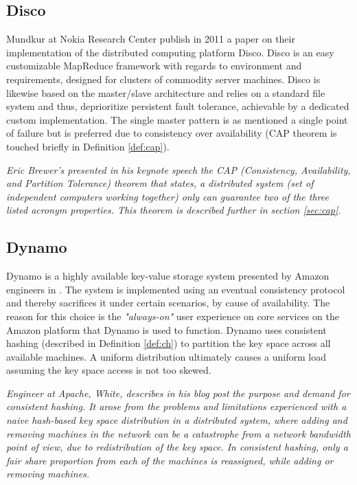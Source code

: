 \subsection*{Disco}
Mundkur \etal at Nokia Research Center publish in 2011 a paper on their implementation of the distributed computing platform Disco\cite{PageDisco}\cite{Mundkur:2011:DCP:2034654.2034670}. Disco is an easy customizable MapReduce framework with regards to environment and requirements, designed for clusters of commodity server machines. Disco is likewise based on the master/slave architecture and relies on a standard file system and thus, deprioritize persistent fault tolerance, achievable by a dedicated custom implementation. The single master pattern is as mentioned a single point of failure but is preferred due to consistency over availability (CAP theorem is touched briefly in Definition \ref{def:cap}).
\vspace*{5mm}

\begin{definition} \label{def:cap}
\textit{Eric Brewer's presented in his keynote speech}\cite{Brewer2000} \textit{the CAP (Consistency, Availability, and Partition Tolerance) theorem that states, a distributed system (set of independent computers working together) only can guarantee two of the three listed acronym properties. This theorem is described further in section \ref{sec:cap}.}
\end{definition}

\vspace*{3mm}
\subsection*{Dynamo}
Dynamo is a highly available key-value storage system presented by Amazon engineers in \cite{DeCandia:2007:DAH:1294261.1294281}. The system is implemented using an eventual consistency protocol and thereby sacrifices it under certain scenarios, by cause of availability. The reason for this choice is the \textit{"always-on"} user experience on core services on the Amazon platform that Dynamo is used to function. Dynamo uses consistent hashing (described in Definition \ref{def:ch}) to partition the key space across all available machines. A uniform distribution ultimately causes a uniform load assuming the key space access is not too skewed.
\vspace*{3mm}

\begin{definition} \label{def:ch}
\textit{Engineer at Apache, White, describes in his blog post} \cite{PageWhiteCH} \textit{the purpose and demand for consistent hashing. It arose from the problems and limitations experienced with a naive hash-based key space distribution in a distributed system, where adding and removing machines in the network can be a catastrophe from a network bandwidth point of view, due to redistribution of the key space. In consistent hashing, only a fair share proportion from each of the machines is reassigned, while adding or removing machines.}
\end{definition}

